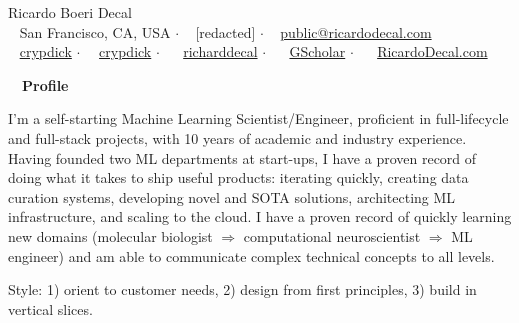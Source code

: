\documentclass[a4paper,12pt]{article}
\newcommand{\resheading}[1]{{\hspace{-9pt} \colorbox{mygrey}{\begin{minipage}{\textwidth}{\textmd{~~\large \textbf{#1} \vphantom{p\^{E}}}}\end{minipage}}\vspace{6pt}} }
\begin{document}
    \begin{center}
    {\Huge Ricardo Boeri Decal}
        \\
        {\small \faMapMarker~ San Francisco, CA, USA $\cdot$ \faPhone~ [redacted] $\cdot$ \faEnvelope~ \href{mailto:public@ricardodecal.com}{public@ricardodecal.com}  \\ \faGithubAlt~ \href{https://github.com/crypdick}{crypdick} $\cdot$~\faStackOverflow~  \href{https://stackoverflow.com/users/4212158/crypdick}{crypdick} $\cdot$ ~\faLinkedin~ \href{https://www.linkedin.com/in/richarddecal/}{richarddecal} $\cdot$ ~\faGraduationCap~ \href{https://scholar.google.com/citations?user=4ODJ78oAAAAJ}{GScholar} $\cdot$ ~\faHome~  \href{https://www.ricardodecal.com}{RicardoDecal.com}} 
    \end{center}

    \resheading{Profile}

    I'm a self-starting Machine Learning Scientist/Engineer, proficient in full-lifecycle and 
    full-stack projects, with 10 years of academic and industry experience.
    Having founded two ML departments at start-ups, I have a proven record of doing what 
    it takes to ship useful products: iterating quickly, creating data curation systems, developing 
    novel and SOTA solutions, architecting ML infrastructure, and scaling to the cloud. 
    I have a proven record of quickly learning new domains (molecular biologist $\Rightarrow$ computational neuroscientist $\Rightarrow$ ML engineer) and am able to communicate complex technical concepts to all levels.

    \vspace{0.5em} %

    Style: 1) orient to customer needs, 2) design from first principles, 3) build in vertical slices.\\
\end{document}
